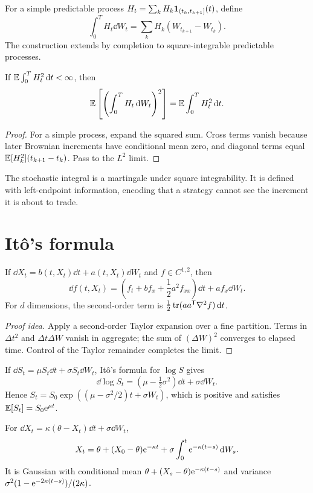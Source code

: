For a simple predictable process
$H_t=\sum_kH_k\mathbf 1_{(t_k,t_{k+1}]}(t)$, define
\[
\int_0^T H_t\dd W_t
=\sum_kH_k(W_{t_{k+1}}-W_{t_k}).
\]
The construction extends by completion to square-integrable predictable processes.

\begin{theorem}
If $\operatorname{\mathbb E}\int_0^T H_t^2\,\mathrm d t<\infty$, then
\[
\operatorname{\mathbb E}\left[\left(\int_0^TH_t\,\mathrm d W_t\right)^2\right]
=\operatorname{\mathbb E}\int_0^TH_t^2\,\mathrm d t.
\]
\end{theorem}
\begin{proof}
For a simple process, expand the squared sum. Cross terms vanish because later
Brownian increments have conditional mean zero, and diagonal terms equal
$\operatorname{\mathbb E}[H_k^2](t_{k+1}-t_k)$. Pass to the $L^2$ limit.
\end{proof}

The stochastic integral is a martingale under square integrability. It is defined
with left-endpoint information, encoding that a strategy cannot see the increment it
is about to trade.

\section{Itô's formula}

\begin{theorem}
If
$\dd X_t=b(t,X_t)\dd t+a(t,X_t)\dd W_t$ and
$f\in C^{1,2}$, then
\[
\dd f(t,X_t)=
\left(f_t+bf_x+\frac12a^2f_{xx}\right)\dd t
+af_x\dd W_t.
\]
For $d$ dimensions, the second-order term is
$\frac12\operatorname{tr}(aa^\mathsf T\nabla^2f)\,\mathrm d t$.
\end{theorem}

\begin{proof}[Proof idea]
Apply a second-order Taylor expansion over a fine partition. Terms in
$\Delta t^2$ and $\Delta t\Delta W$ vanish in aggregate; the sum of
$(\Delta W)^2$ converges to elapsed time. Control of the Taylor remainder completes
the limit.
\end{proof}

\begin{example}
If $\dd S_t=\mu S_t\dd t+\sigma S_t\dd W_t$, Itô's formula for $\log S$ gives
\[
\dd\log S_t=(\mu-\tfrac12\sigma^2)\dd t+\sigma\dd W_t.
\]
Hence
$S_t=S_0\exp((\mu-\sigma^2/2)t+\sigma W_t)$, which is positive and satisfies
$\operatorname{\mathbb E}[S_t]=S_0\mathrm e^{\mu t}$.
\end{example}

\begin{example}
For $\dd X_t=\kappa(\theta-X_t)\dd t+\sigma\dd W_t$,
\[
X_t=\theta+(X_0-\theta)\mathrm e^{-\kappa t}
+\sigma\int_0^t\mathrm e^{-\kappa(t-s)}\,\mathrm d W_s.
\]
It is Gaussian with conditional mean
$\theta+(X_s-\theta)\mathrm e^{-\kappa(t-s)}$ and variance
$\sigma^2(1-\mathrm e^{-2\kappa(t-s)})/(2\kappa)$.
\end{example}

